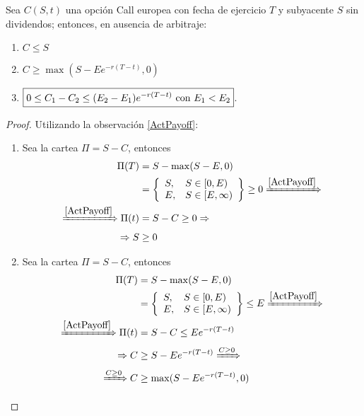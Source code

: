 \begin{proposition} \label{PropsCall}
    Sea $C(S,t)$ una opción Call europea con fecha de ejercicio $T$ y subyacente $S$ sin dividendos; entonces, en ausencia de arbitraje:
    \begin{enumerate}
        \item $\boxed{C \leq S}$
        \item $\boxed{C \geq \max(S-Ee^{-r(T-t)}, 0)}$
        \item $\boxed{0 \leq C_1 -C_2 \leq (E_2-E_1)e^{-r(T-t)}$ con $E_1<E_2}$.
    \end{enumerate}
\end{proposition}
\begin{proof}
    Utilizando la observación \ref{ActPayoff}:
    \begin{enumerate}
        \item Sea la cartea $\Pi = S-C$, entonces
        \begin{align*}
            \Pi(T) &= S - \max(S - E,0) \\
            &= \left\{
            \begin{array}{ll}
              S,       & S\in [0,E) \\
              E,        & S\in [E,\infty)
            \end{array}
            \right\} \geq 0 \xRightarrow{\ref{ActPayoff}} \\
            \xRightarrow{\ref{ActPayoff}} \Pi(t) &= S-C \geq 0 \Rightarrow \\
            \Rightarrow S &\geq 0
        \end{align*}
        \item Sea la cartea $\Pi = S-C$, entonces
        \begin{align*}
            \Pi(T) &= S - \max(S - E,0) \\
            &= \left\{
            \begin{array}{ll}
              S,       & S\in [0,E) \\
              E,        & S\in [E,\infty)
            \end{array}
            \right\} \leq E \xRightarrow{\ref{ActPayoff}}\\
            \xRightarrow{\ref{ActPayoff}} \Pi(t) &= S - C \leq Ee^{-r(T-t)} \\
            \Rightarrow C &\geq  S - Ee^{-r(T-t)} \xRightarrow{C \geq 0} \\
            \xRightarrow{C \geq 0} C &\geq \max(S - Ee^{-r(T-t)}, 0)
        \end{align*}

\end{enumerate}
\end{proof}
